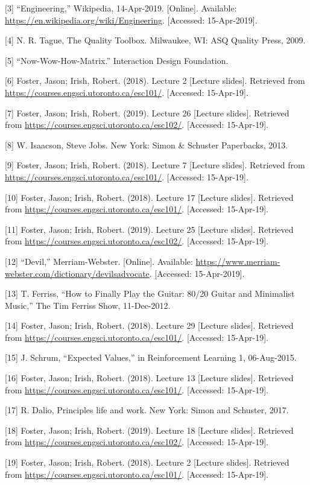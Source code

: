 \documentclass[a4paper,12pt]{article}
\begin{document}
[3] “Engineering,” Wikipedia, 14-Apr-2019. [Online]. Available: \url{https://en.wikipedia.org/wiki/Engineering}. [Accessed: 15-Apr-2019].

[4] N. R. Tague, The Quality Toolbox. Milwaukee, WI: ASQ Quality Press, 2009.

[5] “Now-Wow-How-Matrix.” Interaction Design Foundation.

[6] Foster, Jason; Irish, Robert. (2018). Lecture 2 [Lecture slides]. Retrieved from \url{https://courses.engsci.utoronto.ca/esc101/}. [Accessed: 15-Apr-19].

[7] Foster, Jason; Irish, Robert. (2019). Lecture 26 [Lecture slides]. Retrieved from \url{https://courses.engsci.utoronto.ca/esc102/}. [Accessed: 15-Apr-19].

[8] W. Isaacson, Steve Jobs. New York: Simon \& Schuster Paperbacks, 2013.

[9] Foster, Jason; Irish, Robert. (2018). Lecture 7 [Lecture slides]. Retrieved from \url{https://courses.engsci.utoronto.ca/esc101/}. [Accessed: 15-Apr-19].

[10] Foster, Jason; Irish, Robert. (2018). Lecture 17 [Lecture slides]. Retrieved from \url{https://courses.engsci.utoronto.ca/esc101/}. [Accessed: 15-Apr-19].

[11] Foster, Jason; Irish, Robert. (2019). Lecture 25 [Lecture slides]. Retrieved from \url{https://courses.engsci.utoronto.ca/esc102/}. [Accessed: 15-Apr-19].

[12] “Devil,” Merriam-Webster. [Online]. Available: \url{https://www.merriam-webster.com/dictionary/devilsadvocate}. [Accessed: 15-Apr-2019].

[13] T. Ferriss, “How to Finally Play the Guitar: 80/20 Guitar and Minimalist Music,” The Tim Ferriss Show, 11-Dec-2012.

[14] Foster, Jason; Irish, Robert. (2018). Lecture 29 [Lecture slides]. Retrieved from \url{https://courses.engsci.utoronto.ca/esc101/}. [Accessed: 15-Apr-19].

[15] J. Schrum, “Expected Values,” in Reinforcement Learning 1, 06-Aug-2015.

[16] Foster, Jason; Irish, Robert. (2018). Lecture 13 [Lecture slides]. Retrieved from \url{https://courses.engsci.utoronto.ca/esc101/}. [Accessed: 15-Apr-19].

[17] R. Dalio, Principles life and work. New York: Simon and Schuster, 2017.

[18] Foster, Jason; Irish, Robert. (2019). Lecture 18 [Lecture slides]. Retrieved from \url{https://courses.engsci.utoronto.ca/esc102/}. [Accessed: 15-Apr-19].

[19] Foster, Jason; Irish, Robert. (2018). Lecture 2 [Lecture slides]. Retrieved from \url{https://courses.engsci.utoronto.ca/esc101/}. [Accessed: 15-Apr-19].
\end{document}
